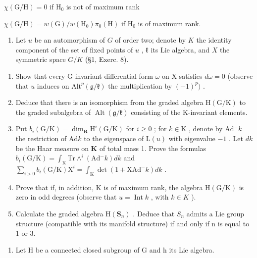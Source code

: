 \begin{enumerate}
\(\chi (\mathrm{G / H}) = 0\) if \(\mathrm{H_0}\) is not of maximum rank

\(\chi (\mathrm{G / H}) = w(\mathrm{G}) / w(\mathrm{H}_0)\pi_0(\mathrm{H})\) if \(\mathrm{H_0}\) is of maximum rank.

\begin{enumerate}
\def\labelenumi{\arabic{enumi})}
\setcounter{enumi}{10}
\tightlist
\item
  Let \(u\) be an automorphism of \(G\) of order two; denote by \(K\) the identity component of the set of fixed points of \(u\) , \(\mathfrak{k}\) its Lie algebra, and \(X\) the symmetric space \(G / K\) (§1, Exerc. 8).
\end{enumerate}

\begin{enumerate}
\def\labelenumi{\alph{enumi})}
\item
  Show that every G-invariant differential form \(\omega\) on X satisfies \(d\omega = 0\) (observe that \(u\) induces on \(\mathrm{Alt}^p (\mathfrak{g} / \mathfrak{k})\) the multiplication by \((-1)^p)\) .
\item
  Deduce that there is an isomorphism from the graded algebra \(\mathrm{H}(\mathrm{G}/\mathrm{K})\) to the graded subalgebra of \(\operatorname{Alt}(\mathfrak{g}/\mathfrak{k})\) consisting of the K-invariant elements.
\item
  Put \(b_{i}(\mathrm{G / K}) = \dim_{\mathbf{R}}\mathrm{H}^{i}(\mathrm{G / K})\) for \(i\geq 0\) ; for \(k\in \mathrm{K}\) , denote by \(\mathrm{Ad}^{-}k\) the restriction of \(\mathrm{Ad}k\) to the eigenspace of \(\mathrm{L}(u)\) with eigenvalue \(-1\) . Let \(dk\) be the Haar measure on \(\mathbf{K}\) of total mass 1. Prove the formulas \(b_{i}(\mathrm{G / K}) = \int_{\mathrm{K}}\mathrm{Tr}\wedge^{i}(\mathrm{Ad}^{-}k)dk\) and \(\sum_{i > 0}b_{i}(\mathrm{G / K})\mathrm{X}^{i} = \int_{\mathrm{K}}\det (1 + \mathrm{XAd}^{-}k)dk\) .
\item
  Prove that if, in addition, K is of maximum rank, the algebra \(\mathrm{H}(\mathrm{G}/\mathrm{K})\) is zero in odd degrees (observe that \(u = \operatorname{Int} k\) , with \(k \in K\) ).
\item
  Calculate the graded algebra \(\mathrm{H}(\mathbf{S}_{n})\) . Deduce that \(S_{n}\) admits a Lie group structure (compatible with its manifold structure) if and only if n is equal to 1 or 3.
\end{enumerate}

\begin{enumerate}
\def\labelenumi{\arabic{enumi})}
\setcounter{enumi}{11}
\tightlist
\item
  Let H be a connected closed subgroup of G and h its Lie algebra.
\end{enumerate}


\end{enumerate}
